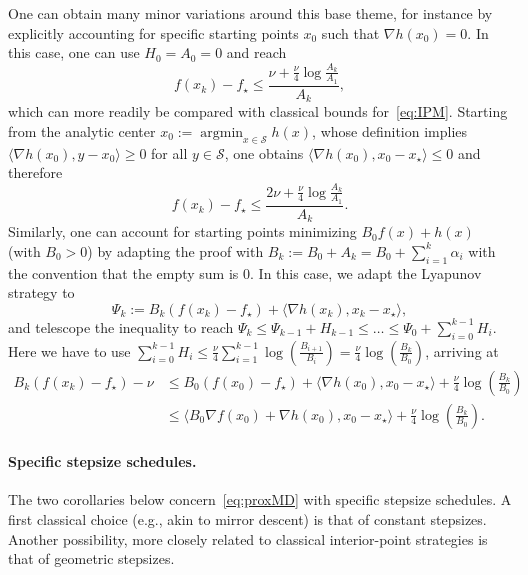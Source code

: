 \documentclass[a4paper]{article}
\renewcommand{\leq}{\leqslant}
\renewcommand{\geq}{\geqslant}
\renewcommand{\SS}{\mathcal{S}}
\newcommand{\coloneqq}{:=}
\newcommand{\ip}[2]{\langle #1, #2\rangle}
\DeclareMathOperator*{\argmin}{argmin}
\begin{document}
One can obtain many minor variations around this base theme, for instance by explicitly accounting for specific starting points $x_0$ such that $\nabla h(x_0)=0$.
In this case, one can use $H_0=A_0=0$ and reach
\begin{equation}
    \label{eq:proxMD_guarantee_analytic_center}
    f(x_k)-f_\star\leq \frac{ \nu + \frac \nu 4\log\frac{A_k}{A_1}}{A_k},
  \end{equation}
which can more readily be compared with classical bounds for~\eqref{eq:IPM}.
Starting from the analytic center $x_0 \coloneqq \argmin_{x\in \SS} h(x)$, whose definition implies $\ip{\nabla h(x_0)}{y-x_0}\geq 0$ for all $y\in\SS$, one obtains
$\ip{\nabla h(x_0)}{x_0-x_\star}\leq 0$ and therefore
\begin{equation*}
        f(x_k)-f_\star\leq \frac{ 2\nu + \frac \nu 4\log\frac{A_k}{A_1}}{A_k}.
\end{equation*}
Similarly, one can account for starting points minimizing $B_0 f(x)+h(x)$ (with $B_0>0$) by adapting the proof with $B_k\coloneqq B_0+A_k=B_0+\sum_{i=1}^k \alpha_i$ with the convention that the empty sum is $0$.
In this case, we adapt the Lyapunov strategy to
\[ \Psi_k\coloneqq B_k\left(f(x_{k})-f_\star\right) + \ip{\nabla h(x_{k})}{ x_{k}-x_\star},\]
and telescope the inequality to reach $\Psi_k\leq \Psi_{k-1}+H_{k-1}\leq \ldots \leq \Psi_{0}+\sum_{i=0}^{k-1} H_{i}$.
Here we have to use $\sum_{i=0}^{k-1}H_i\leq \frac\nu 4\sum_{i=1}^{k-1} \log\left(\frac{B_{i+1}}{B_i}\right)= \frac\nu 4 \log\left(\frac{B_{k}}{B_0}\right)$, arriving at
\begin{align}
        B_k (f(x_k)-f_\star)-\nu&\leq B_0\left(f(x_{0})-f_\star\right) + \ip{\nabla h(x_{0})}{ x_{0}-x_\star}+\frac\nu 4 \log\left(\frac{B_{k}}{B_0}\right) \nonumber\\
        &\leq \ip{B_0 \nabla f(x_0)+\nabla h(x_{0})}{ x_{0}-x_\star}+\frac\nu 4 \log\left(\frac{B_{k}}{B_0}\right).
        \label{eq:proxMD_guarantee_other_starting_point}
\end{align}

\paragraph{Specific stepsize schedules.}
The two corollaries below concern~\eqref{eq:proxMD} with specific stepsize schedules. A first classical choice (e.g., akin to mirror descent) is that of constant stepsizes. Another possibility, more closely related to classical interior-point strategies is that of geometric stepsizes.
\end{document}
